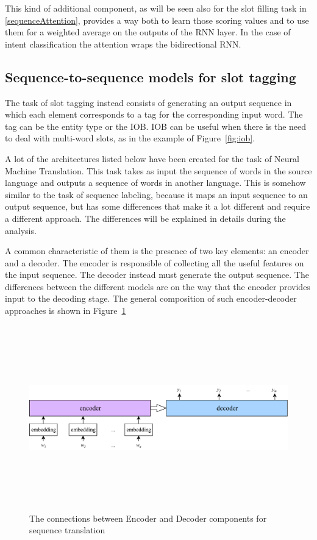 This kind of additional component, as will be seen also for the slot filling task in \ref{sequenceAttention}, provides a way both to learn those scoring values and to use them for a weighted average on the outputs of the RNN layer. In the case of intent classification the attention wraps the bidirectional RNN.

\subsection{Sequence-to-sequence models for slot tagging}
\label{soaSeq2Seq}

The task of slot tagging instead consists of generating an output sequence in which each element corresponds to a tag for the corresponding input word. The tag can be the entity type or the IOB. IOB can be useful when there is the need to deal with multi-word slots, as in the example of Figure~\ref{fig:iob}.

A lot of the architectures listed below have been created for the task of Neural Machine Translation. This task takes as input the sequence of words in the source language and outputs a sequence of words in another language. This is somehow similar to the task of sequence labeling, because it maps an input sequence to an output sequence, but has some differences that make it a lot different and require a different approach. The differences will be explained in details during the analysis.

A common characteristic of them is the presence of two key elements: an encoder and a decoder. The encoder is responsible of collecting all the useful features on the input sequence. The decoder instead must generate the output sequence. The differences between the different models are on the way that the encoder provides input to the decoding stage. The general composition of such encoder-decoder approaches is shown in Figure~\ref{fig:encoderDecoder}

\begin{figure}[!htbp]
    \centering
    \includegraphics[max width=\linewidth,max height=8cm,keepaspectratio]{figures/encoderDecoder}
    \caption{The connections between Encoder and Decoder components for sequence translation}\label{fig:encoderDecoder}
\end{figure}

